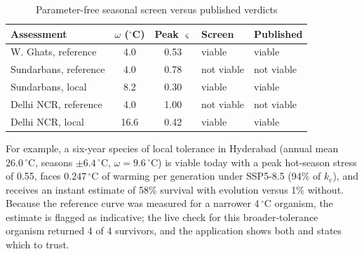 \documentclass[conference]{IEEEtran}
\begin{document}
\begin{table}[t]
\caption{Parameter-free seasonal screen versus published verdicts}
\label{tab:screen}
\centering
\setlength{\tabcolsep}{4pt}
\begin{tabular}{lccll}
\toprule
Assessment & $\omega$ ($^{\circ}$C) & Peak $\varsigma$ & Screen & Published\\
\midrule
W. Ghats, reference & 4.0 & 0.53 & viable & viable\\
Sundarbans, reference & 4.0 & 0.78 & not viable & not viable\\
Sundarbans, local & 8.2 & 0.30 & viable & viable\\
Delhi NCR, reference & 4.0 & 1.00 & not viable & not viable\\
Delhi NCR, local & 16.6 & 0.42 & viable & viable\\
\bottomrule
\end{tabular}
\end{table}

For example, a six-year species of local tolerance in Hyderabad
(annual mean 26.0\,$^{\circ}$C, seasons $\pm6.4\,^{\circ}$C, $\omega=9.6\,^{\circ}$C)
is viable today with a peak hot-season stress of 0.55, faces
$0.247\,^{\circ}$C of warming per generation under SSP5-8.5 (94\% of $k_c$), and
receives an instant estimate of 58\% survival with evolution versus 1\% without.
Because the reference curve was measured for a narrower 4\,$^{\circ}$C organism,
the estimate is flagged as indicative; the live check for this broader-tolerance
organism returned 4 of 4 survivors, and the application shows both and states
which to trust.
\end{document}

